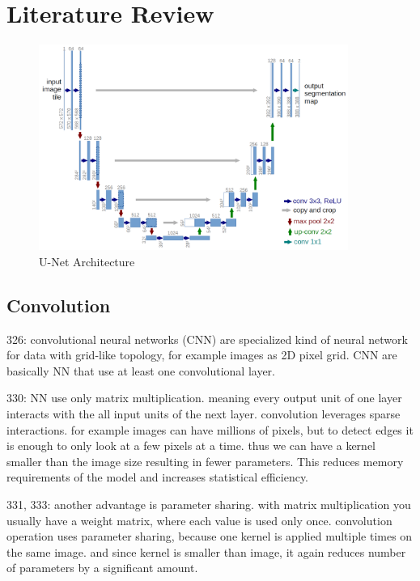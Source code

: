 \section{Literature Review}
\begin{figure}[h]
    \centering
    \includegraphics[width=0.9\textwidth]{images/u-net-architecture}
    \caption{U-Net Architecture \cite{unet15}}
    \label{fig:unet_architecture}
\end{figure}

\subsection{Convolution}
\cite{DLbook16}
326: convolutional neural networks (CNN) are specialized kind of neural network for data with grid-like topology, for example images as 2D pixel grid. CNN are basically NN that use at least one convolutional layer.

330: NN use only matrix multiplication. meaning every output unit of one layer interacts with the all input units of the next layer. convolution leverages sparse interactions. for example images can have millions of pixels, but to detect edges it is enough to only look at a few pixels at a time. thus we can have a kernel smaller than the image size resulting in fewer parameters. This reduces memory requirements of the model and increases statistical efficiency.

331, 333: another advantage is parameter sharing. with matrix multiplication you usually have a weight matrix, where each value is used only once. convolution operation uses parameter sharing, because one kernel is applied multiple times on the same image. and since kernel is smaller than image, it again reduces number of parameters by a significant amount.


